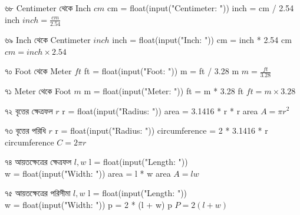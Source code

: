 
\formulaexercise
{৬৮}
{Centimeter থেকে Inch}
{\(cm\)}
{cm = float(input("Centimeter: "))}
{inch = cm / 2.54}
{inch}
{\(inch=\frac{cm}{2.54}\)}


\formulaexercise
{৬৯}
{Inch থেকে Centimeter}
{\(inch\)}
{inch = float(input("Inch: "))}
{cm = inch * 2.54}
{cm}
{\(cm=inch\times2.54\)}


\formulaexercise
{৭০}
{Foot থেকে Meter}
{\(ft\)}
{ft = float(input("Foot: "))}
{m = ft / 3.28}
{m}
{\(m=\frac{ft}{3.28}\)}


\formulaexercise
{৭১}
{Meter থেকে Foot}
{\(m\)}
{m = float(input("Meter: "))}
{ft = m * 3.28}
{ft}
{\(ft=m\times3.28\)}


\formulaexercise
{৭২}
{বৃত্তের ক্ষেত্রফল}
{\(r\)}
{r = float(input("Radius: "))}
{area = 3.1416 * r * r}
{area}
{\(A=\pi r^2\)}


\formulaexercise
{৭৩}
{বৃত্তের পরিধি}
{\(r\)}
{r = float(input("Radius: "))}
{circumference = 2 * 3.1416 * r}
{circumference}
{\(C=2\pi r\)}


\formulaexercise
{৭৪}
{আয়তক্ষেত্রের ক্ষেত্রফল}
{\(l,w\)}
{l = float(input("Length: "))\\
w = float(input("Width: "))}
{area = l * w}
{area}
{\(A=lw\)}


\formulaexercise
{৭৫}
{আয়তক্ষেত্রের পরিসীমা}
{\(l,w\)}
{l = float(input("Length: "))\\
w = float(input("Width: "))}
{p = 2 * (l + w)}
{p}
{\(P=2(l+w)\)}

